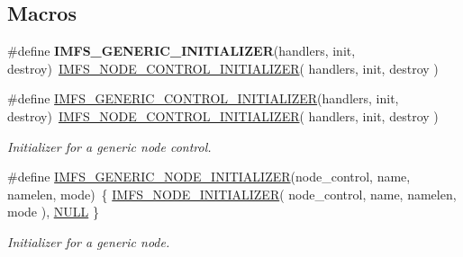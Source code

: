 \subsection*{Macros}
\begin{DoxyCompactItemize}
\item 
\mbox{\label{group__IMFSGenericNodes_ga6f88e6c31de1206bd6a0921bd3f57e33}} 
\#define {\bfseries I\+M\+F\+S\+\_\+\+G\+E\+N\+E\+R\+I\+C\+\_\+\+I\+N\+I\+T\+I\+A\+L\+I\+Z\+ER}(handlers,  init,  destroy)~\mbox{\hyperlink{group__IMFS_ga3003884652843bc2a52af880d6accf4f}{I\+M\+F\+S\+\_\+\+N\+O\+D\+E\+\_\+\+C\+O\+N\+T\+R\+O\+L\+\_\+\+I\+N\+I\+T\+I\+A\+L\+I\+Z\+ER}}( handlers, init, destroy )
\item 
\#define \mbox{\hyperlink{group__IMFSGenericNodes_ga8764e226d4483098ea7e5dee061927f3}{I\+M\+F\+S\+\_\+\+G\+E\+N\+E\+R\+I\+C\+\_\+\+C\+O\+N\+T\+R\+O\+L\+\_\+\+I\+N\+I\+T\+I\+A\+L\+I\+Z\+ER}}(handlers,  init,  destroy)~\mbox{\hyperlink{group__IMFS_ga3003884652843bc2a52af880d6accf4f}{I\+M\+F\+S\+\_\+\+N\+O\+D\+E\+\_\+\+C\+O\+N\+T\+R\+O\+L\+\_\+\+I\+N\+I\+T\+I\+A\+L\+I\+Z\+ER}}( handlers, init, destroy )
\begin{DoxyCompactList}\small\item\em Initializer for a generic node control. \end{DoxyCompactList}\item 
\#define \mbox{\hyperlink{group__IMFSGenericNodes_gaa92e5380e1b89f2b97f03f2f47ec5302}{I\+M\+F\+S\+\_\+\+G\+E\+N\+E\+R\+I\+C\+\_\+\+N\+O\+D\+E\+\_\+\+I\+N\+I\+T\+I\+A\+L\+I\+Z\+ER}}(node\+\_\+control,  name,  namelen,  mode)~\{ \mbox{\hyperlink{group__IMFS_gadf395ed2a459636e9554349d7227da6d}{I\+M\+F\+S\+\_\+\+N\+O\+D\+E\+\_\+\+I\+N\+I\+T\+I\+A\+L\+I\+Z\+ER}}( node\+\_\+control, name, namelen, mode ), \mbox{\hyperlink{bestcomm__api_8h_a872bb74de61c3689ccd5b41873fce42c}{N\+U\+LL}} \}
\begin{DoxyCompactList}\small\item\em Initializer for a generic node. \end{DoxyCompactList}\end{DoxyCompactItemize}
